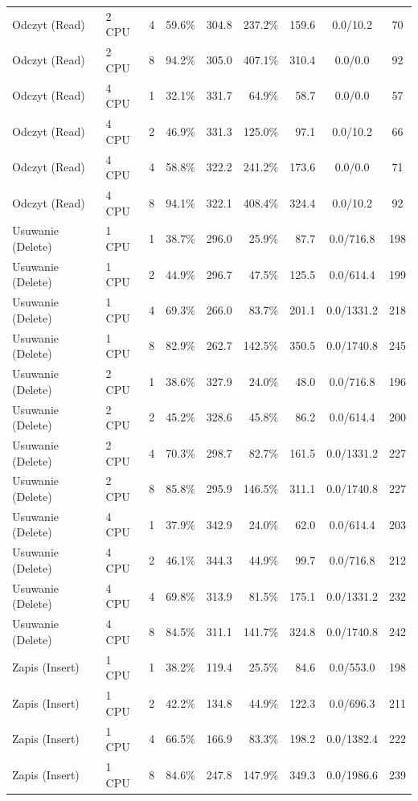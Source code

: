 \begin{table}[ht]
{\begin{tabular}{llcrrrrcc}
Odczyt (Read) & 2 CPU & 4 & 59.6\% & 304.8 & 237.2\% & 159.6 & 0.0/10.2 & 70 \\
Odczyt (Read) & 2 CPU & 8 & 94.2\% & 305.0 & 407.1\% & 310.4 & 0.0/0.0 & 92 \\
Odczyt (Read) & 4 CPU & 1 & 32.1\% & 331.7 & 64.9\% & 58.7 & 0.0/0.0 & 57 \\
Odczyt (Read) & 4 CPU & 2 & 46.9\% & 331.3 & 125.0\% & 97.1 & 0.0/10.2 & 66 \\
Odczyt (Read) & 4 CPU & 4 & 58.8\% & 322.2 & 241.2\% & 173.6 & 0.0/0.0 & 71 \\
Odczyt (Read) & 4 CPU & 8 & 94.1\% & 322.1 & 408.4\% & 324.4 & 0.0/10.2 & 92 \\
Usuwanie (Delete) & 1 CPU & 1 & 38.7\% & 296.0 & 25.9\% & 87.7 & 0.0/716.8 & 198 \\
Usuwanie (Delete) & 1 CPU & 2 & 44.9\% & 296.7 & 47.5\% & 125.5 & 0.0/614.4 & 199 \\
Usuwanie (Delete) & 1 CPU & 4 & 69.3\% & 266.0 & 83.7\% & 201.1 & 0.0/1331.2 & 218 \\
Usuwanie (Delete) & 1 CPU & 8 & 82.9\% & 262.7 & 142.5\% & 350.5 & 0.0/1740.8 & 245 \\
Usuwanie (Delete) & 2 CPU & 1 & 38.6\% & 327.9 & 24.0\% & 48.0 & 0.0/716.8 & 196 \\
Usuwanie (Delete) & 2 CPU & 2 & 45.2\% & 328.6 & 45.8\% & 86.2 & 0.0/614.4 & 200 \\
Usuwanie (Delete) & 2 CPU & 4 & 70.3\% & 298.7 & 82.7\% & 161.5 & 0.0/1331.2 & 227 \\
Usuwanie (Delete) & 2 CPU & 8 & 85.8\% & 295.9 & 146.5\% & 311.1 & 0.0/1740.8 & 227 \\
Usuwanie (Delete) & 4 CPU & 1 & 37.9\% & 342.9 & 24.0\% & 62.0 & 0.0/614.4 & 203 \\
Usuwanie (Delete) & 4 CPU & 2 & 46.1\% & 344.3 & 44.9\% & 99.7 & 0.0/716.8 & 212 \\
Usuwanie (Delete) & 4 CPU & 4 & 69.8\% & 313.9 & 81.5\% & 175.1 & 0.0/1331.2 & 232 \\
Usuwanie (Delete) & 4 CPU & 8 & 84.5\% & 311.1 & 141.7\% & 324.8 & 0.0/1740.8 & 242 \\
Zapis (Insert) & 1 CPU & 1 & 38.2\% & 119.4 & 25.5\% & 84.6 & 0.0/553.0 & 198 \\
Zapis (Insert) & 1 CPU & 2 & 42.2\% & 134.8 & 44.9\% & 122.3 & 0.0/696.3 & 211 \\
Zapis (Insert) & 1 CPU & 4 & 66.5\% & 166.9 & 83.3\% & 198.2 & 0.0/1382.4 & 222 \\
Zapis (Insert) & 1 CPU & 8 & 84.6\% & 247.8 & 147.9\% & 349.3 & 0.0/1986.6 & 239 \\

\end{tabular}}
\end{table}
